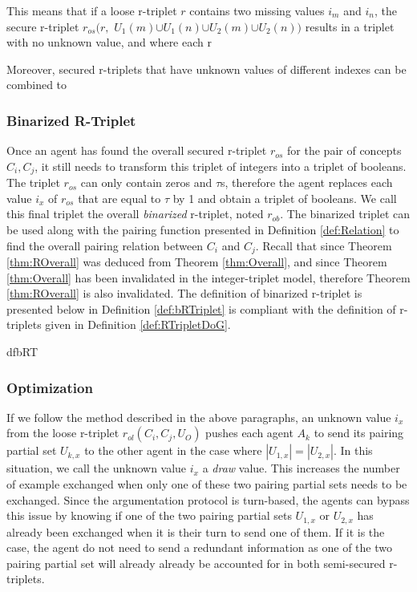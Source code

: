 This means that if a loose r-triplet $r$ contains two missing values $i_{m}$ and $i_{n}$, the secure r-triplet  $r_{os}(r,$ $U_{1}(m)$$\cup$$U_{1}(n)$$\cup$$U_{2}(m)$$\cup$$U_{2}(n))$ results in a triplet with no unknown value, and where each r

Moreover, secured r-triplets that have unknown values of different indexes can be combined to 

\subsubsection{Binarized R-Triplet}

Once an agent has found the overall secured r-triplet $r_{os}$ for the pair of concepts $C_{i}, C_{j}$, it still needs to transform this triplet of integers into a triplet of booleans. The triplet $r_{os}$ can only contain zeros and $\tau$s, therefore the agent replaces each value $i_{x}$ of $r_{os}$ that are equal to $\tau$ by 1 and obtain a triplet of booleans. We call this final triplet the overall \emph{binarized} r-triplet, noted $r_{ob}$. The binarized triplet can be used along with the pairing function presented in Definition \ref{def:Relation} to find the overall pairing relation between $C_{i}$ and $C_{j}$. Recall that since Theorem \ref{thm:ROverall} was deduced from Theorem \ref{thm:Overall}, and since Theorem \ref{thm:Overall} has been invalidated in the integer-triplet model, therefore Theorem \ref{thm:ROverall} is also invalidated. The definition of binarized r-triplet is presented below in Definition \ref{def:bRTriplet} is compliant with the definition of r-triplets given in Definition \ref{def:RTripletDoG}.

\begin{restatable}{df}{bRT}\label{def:bRTriplet}

\end{restatable}

\subsubsection{Optimization}
If we follow the method described in the above paragraphs, an unknown value $i_{x}$ from the loose r-triplet $r_{ol}(C_{i},C_{j},U_{O})$ pushes each agent $A_{k}$ to send its pairing partial set $U_{k,x}$ to the other agent in the case where $|U_{1,x}| = |U_{2,x}|$. In this situation, we call the unknown value $i_{x}$ a \emph{draw} value. This increases the number of example exchanged when only one of these two pairing partial sets needs to be exchanged. Since the argumentation protocol is turn-based, the agents can bypass this issue by knowing if one of the two pairing partial sets $U_{1,x}$ or $U_{2,x}$ has already been exchanged when it is their turn to send one of them. If it is the case, the agent do not need to send a redundant information as one of the two pairing partial set will already already be accounted for in both semi-secured r-triplets.


